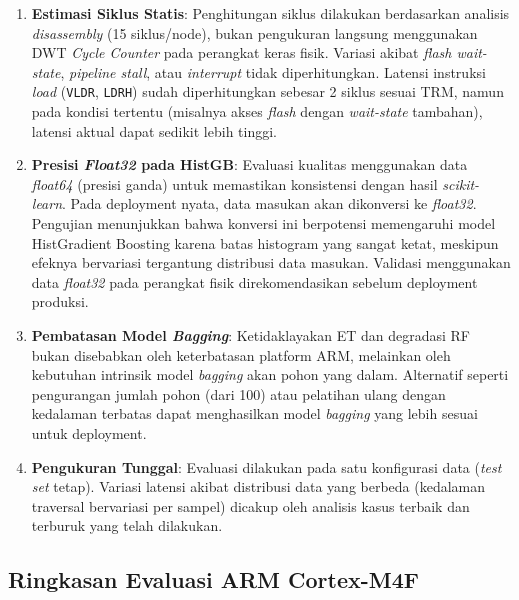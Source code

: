 \begin{enumerate}
    \item \textbf{Estimasi Siklus Statis}: Penghitungan siklus dilakukan berdasarkan analisis \textit{disassembly} (15 siklus/node), bukan pengukuran langsung menggunakan DWT \textit{Cycle Counter} pada perangkat keras fisik. Variasi akibat \textit{flash wait-state}, \textit{pipeline stall}, atau \textit{interrupt} tidak diperhitungkan. Latensi instruksi \textit{load} (\texttt{VLDR}, \texttt{LDRH}) sudah diperhitungkan sebesar 2 siklus sesuai TRM, namun pada kondisi tertentu (misalnya akses \textit{flash} dengan \textit{wait-state} tambahan), latensi aktual dapat sedikit lebih tinggi.

    \item \textbf{Presisi \textit{Float32} pada HistGB}: Evaluasi kualitas menggunakan data \textit{float64} (presisi ganda) untuk memastikan konsistensi dengan hasil \textit{scikit-learn}. Pada deployment nyata, data masukan akan dikonversi ke \textit{float32}. Pengujian menunjukkan bahwa konversi ini berpotensi memengaruhi model HistGradient Boosting karena batas histogram yang sangat ketat, meskipun efeknya bervariasi tergantung distribusi data masukan. Validasi menggunakan data \textit{float32} pada perangkat fisik direkomendasikan sebelum deployment produksi.

    \item \textbf{Pembatasan Model \textit{Bagging}}: Ketidaklayakan ET dan degradasi RF bukan disebabkan oleh keterbatasan platform ARM, melainkan oleh kebutuhan intrinsik model \textit{bagging} akan pohon yang dalam. Alternatif seperti pengurangan jumlah pohon (dari 100) atau pelatihan ulang dengan kedalaman terbatas dapat menghasilkan model \textit{bagging} yang lebih sesuai untuk deployment.

    \item \textbf{Pengukuran Tunggal}: Evaluasi dilakukan pada satu konfigurasi data (\textit{test set} tetap). Variasi latensi akibat distribusi data yang berbeda (kedalaman traversal bervariasi per sampel) dicakup oleh analisis kasus terbaik dan terburuk yang telah dilakukan.
\end{enumerate}

\subsection{Ringkasan Evaluasi ARM Cortex-M4F}

